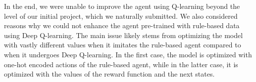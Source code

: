 In the end, we were unable to improve the agent using Q-learning beyond the level of our initial project, 
which we naturally submitted. We also considered reasons why we could not enhance the agent pre-trained with rule-based 
data using Deep Q-learning. The main issue likely stems from optimizing the model with vastly different values when it imitates 
the rule-based agent compared to when it undergoes Deep Q-learning. In the first case, the model is optimized with one-hot encoded 
actions of the rule-based agent, while in the latter case, it is optimized with the values of the reward function and the next states.